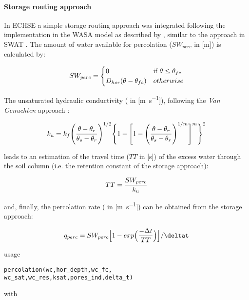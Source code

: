 \paragraph{Storage routing approach}
In ECHSE a simple storage routing approach was integrated following the implementation in the WASA model as described by \citet{Guentner2002}, similar to the approach in SWAT \citep{Neitsch2011}. The amount of water available for percolation ($SW_{perc}$ in [\si{\metre}]) is calculated by:

\begin{equation}
SW_{perc} = 
\begin{cases}
0 & \mbox{if } \theta \leq \theta_{fc} \\
D_{hor} (\theta - \theta_{fc}) & otherwise
\end{cases}
\end{equation}

The unsaturated hydraulic conductivity (\hydrCond{} in [\si{\metre\per\second}]), following the \emph{Van Genuchten} approach \citep{Maidment1993}:

\begin{equation}
k_{u} = k_{f} \Biggl( \frac{\theta - \theta_r}{\theta_s - \theta_r} \Biggr)^{1/2} \Biggl\{ 1 - \Biggl[ 1 - \Biggl( \frac{\theta - \theta_r}{\theta_s - \theta_r} \Biggr)^{1/m} \Biggr]^m \Biggr\}^2
\end{equation}

\noindent
leads to an estimation of the travel time ($TT$ in [\si{\second}]) of the excess water through the soil column (i.e. the retention constant of the storage approach):

\begin{equation}
TT = \frac{SW_{perc}}{k_{u}}
\end{equation}

\noindent
and, finally, the percolation rate (\percol{} in [\si{\metre\per\second}]) can be obtained from the storage approach:

\begin{equation}
\percol = SW_{perc} \Bigl[ 1 - exp \Bigl( \frac{- \Delta t}{TT} \Bigr) \Bigr] / \deltat
\end{equation}

\noindent
usage
\begin{verbatim}
percolation(wc,hor_depth,wc_fc,
wc_sat,wc_res,ksat,pores_ind,delta_t)
\end{verbatim}

\noindent
with\\ \vspace*{2ex}

